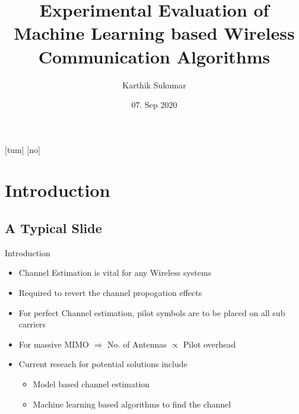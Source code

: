 \documentclass[10pt,t]{beamer}
\title{Experimental Evaluation of Machine Learning based Wireless Communication Algorithms}
\author[Karthik Sukumar (TUM)]{Karthik Sukumar}
\institute{\MSVname}
\date{07. Sep 2020}
\begin{document}
{

%
%

[tum]
[no]
\begin{frame}
\titlepage
\end{frame}
}

\section{Introduction}
\subsection{A Typical Slide}


\begin{frame}{Introduction}

    \begin{itemize}
        \item Channel Estimation is vital for any Wireless systems
            \bigskip
        \item Required to revert the channel propogation effects
            \bigskip
            \pause

        \item For perfect Channel estimation, pilot symbols are to be placed on all sub carriers
            \bigskip
        \item For massive MIMO $\Rightarrow$ No. of Antennas $\propto$ Pilot overhead
            \bigskip
            \pause

        \item Current reseach for potential solutions include
            \begin{itemize}
                \item Model based channel estimation %
                \item Machine learning based algorithms to find the channel
            \end{itemize}
    \end{itemize}


\end{frame}
\end{document}
